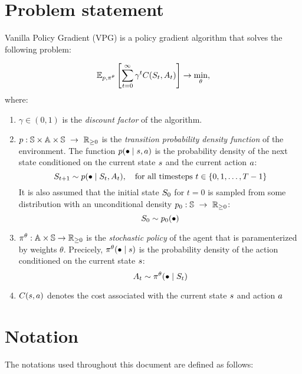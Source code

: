 \documentclass[12pt,twoside]{../../mitthesis}
\begin{document}
\section*{Problem statement}
Vanilla Policy Gradient (VPG) is a policy gradient algorithm that solves the following problem:

\begin{equation}
    \label{eqn_ppo_problem}
    \E[\transit, \policy^{\theta}]{\sum_{t = 0}^{\infty} \gamma ^ t \Cost(\State_{t}, \Action_{t})} \ra \min_{\theta},
\end{equation}
where:
\begin{enumerate}
    \item $\gamma \in (0, 1)$ is the \textit{discount factor} of the algorithm. 
    \item  $p : \mathbb S \times \mathbb A \times \mathbb S \ \rightarrow \ {\mathbb{R}}_{\geq 0}$ is the \textit{transition probability density function} of the environment. The function $p(\bullet \mid s, a)$ is the probability density of the next state conditioned on the current state $s$ and the current action $a$:
    $$
        S_{t+1} \sim p(\bullet \mid S_t, A_t), \quad \text{for all timesteps } t \in \{0, 1, \dots, T-1\} 
    $$
    It is also assumed that the initial state $S_0$ for $t = 0$ is sampled from some distribution with an unconditional density $p_0 : \mathbb S \ \rightarrow \ {\mathbb{R}}_{\geq 0}$:
    $$
        S_0 \sim p_0(\bullet)
    $$
    \item $\pi^{\theta} : \mathbb A \times \mathbb S \rightarrow {\mathbb{R}}_{\geq 0}$ is the \textit{stochastic policy} of the agent that is paramenterized by weights $\theta$. Precicely, $\pi^{\theta}(\bullet \mid s)$ is the probability density of the action conditioned on the current state $s$:
    $$
        A_t \sim \pi^{\theta}(\bullet \mid S_t)
    $$
    \item $C(s, a)$ denotes the cost associated with the current state $s$ and action $a$
\end{enumerate}

\section*{Notation}
The notations used throughout this document are defined as follows:
\end{document}
